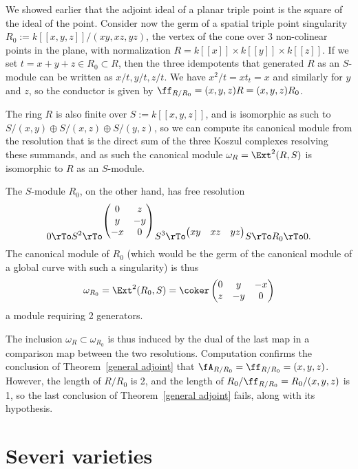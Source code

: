 \begin{example}\label{nongorenstein}
We showed earlier that the adjoint ideal of a planar triple point is the square of the ideal of the point. Consider now
  the germ of a spatial triple point singularity $R_0 := k[[x,y,z]]/(xy, xz,yz)$, the vertex of the cone over 3
 non-colinear points in the plane, with normalization $R = k[[x]]\times k[[y]]\times k[[z]]$.
 If we set $t = x+y+z\in R_0\subset R$, then the three idempotents that generated $R$ as an $S$-module
 can be written as $x/t, y/t, z/t$. We have $x^2/t = xt_t= x$ and similarly for $y$ and $z$, so
 the conductor is given by $\ff_{R/R_0} = (x,y,z)R = (x,y,z)R_0$.
 
 The ring $R$ is also finite over $S := k[[x,y,z]]$, and is isomorphic as such to 
 $S/(x,y)\oplus S/(x,z) \oplus S/(y,z)$, so we can compute its canonical module from the
 resolution that is the direct sum of the three Koszul complexes resolving these summands, and 
 as such the canonical module $\omega_R = \Ext^2(R,S)$ is isomorphic to $R$ as an $S$-module.
 

 The $S$-module $R_0$, on the other hand,   has free resolution
 $$
 0\rTo S^2\rTo^{
	\begin{pmatrix}
 0&z\\
 y&-y\\
 -x&0
\end{pmatrix}}
 S^3 \rTo^{
\begin{pmatrix}
 xy&xz&yz
\end{pmatrix}}
 S \rTo R_0 \rTo 0. 
 $$
The canonical module of $R_0$ (which would be the germ of the canonical module of a global curve with such a singularity) is thus 
 $$
 \omega_{R_0} = \Ext^2(R_0, S) = 
 \coker 
\begin{pmatrix}
 0&y&-x\\z&-y&0
\end{pmatrix}
$$
a module requiring 2 generators.
\end{example}
The inclusion $\omega_{R} \subset \omega_{R_0}$ is thus induced by the 
dual of the last map in a comparison map between the two resolutions. Computation
confirms the conclusion of Theorem~\ref{general adjoint} that $\fA_{R/R_0} = \ff_{R/R_0} = (x,y,z)$. However, the length of $R/R_0$ is 2, and the length of $R_0/\ff_{R/R_0} = R_0/(x,y,z)$ is  1, so the
last conclusion of Theorem~\ref{general adjoint} fails, along with its hypothesis.

\section{Severi varieties}\label{severi variety}

